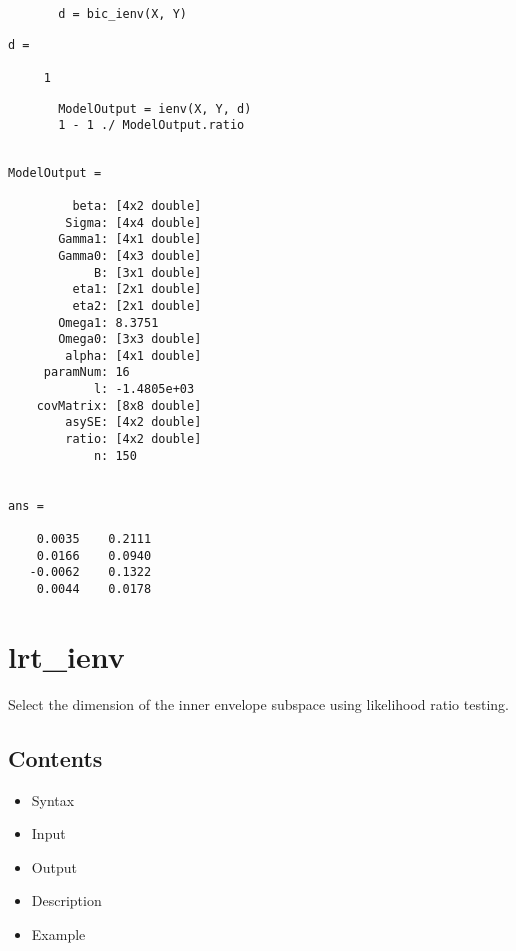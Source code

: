 \documentclass[a4paper,11pt,openany]{memoir}
\begin{document}
\begin{verbatim}       d = bic_ienv(X, Y)\end{verbatim}
        \color{lightgray}\ttfamily \begin{verbatim}
d =

     1
\end{verbatim} \rmfamily
\color{black}
\begin{verbatim}       ModelOutput = ienv(X, Y, d)
       1 - 1 ./ ModelOutput.ratio\end{verbatim}
        \color{lightgray}\ttfamily \begin{verbatim}

ModelOutput = 

         beta: [4x2 double]
        Sigma: [4x4 double]
       Gamma1: [4x1 double]
       Gamma0: [4x3 double]
            B: [3x1 double]
         eta1: [2x1 double]
         eta2: [2x1 double]
       Omega1: 8.3751
       Omega0: [3x3 double]
        alpha: [4x1 double]
     paramNum: 16
            l: -1.4805e+03
    covMatrix: [8x8 double]
        asySE: [4x2 double]
        ratio: [4x2 double]
            n: 150


ans =

    0.0035    0.2111
    0.0166    0.0940
   -0.0062    0.1322
    0.0044    0.0178

\end{verbatim} \rmfamily
\color{black}


\newpage


\rmfamily
\color{black}\section{lrt\_ienv}

\begin{par}
Select the dimension of the inner envelope subspace using likelihood ratio testing.
\end{par} \vspace{1em}

\subsection*{Contents}

\begin{itemize}
\setlength{\itemsep}{-1ex}
   \item Syntax
   \item Input
   \item Output
   \item Description
   \item Example
\end{itemize}
\end{document}
